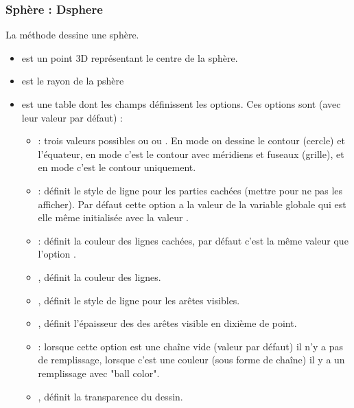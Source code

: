 \subsubsection{ Sphère : Dsphere}

La méthode  dessine une sphère.

\begin{itemize}
    \item {} est un point 3D représentant le centre de la sphère.
    \item {} est le rayon de la pshère
    \item {} est une table dont les champs définissent les options. Ces options sont (avec leur valeur par défaut) :
        \begin{itemize}
            \item {} : trois valeurs possibles  ou  ou . En mode  on dessine le contour (cercle) et l'équateur, en mode  c'est le contour avec méridiens et fuseaux (grille), et en mode  c'est le contour uniquement.
            
            \item {} : définit le style de ligne pour les parties cachées (mettre  pour ne pas les afficher). Par défaut cette option a la valeur de la variable globale  qui est elle même initialisée avec la valeur .
            
            \item {}: définit la couleur des lignes cachées, par défaut c'est la même valeur que l'option .
            
            \item {}, définit la couleur des lignes.

            \item {}, définit le style de ligne pour les arêtes visibles.

            \item {}, définit l'épaisseur des des arêtes visible en dixième de point.            
    
            \item {}: lorsque cette option est une chaîne vide (valeur par défaut) il n'y a pas de remplissage, lorsque c'est une couleur (sous forme de chaîne) il y a un remplissage avec "ball color".
            
            \item {}, définit la transparence du dessin.
        \end{itemize}
\end{itemize}

